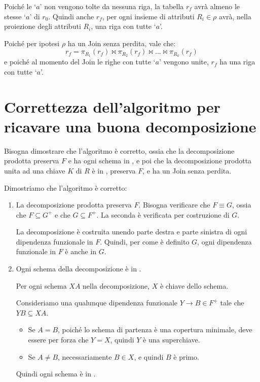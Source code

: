 Poich\'e le `$a$' non vengono tolte da nessuna riga, la tabella $r_f$ avr\`a almeno le stesse `$a$' di $r_0$. Quindi anche $r_f$, per ogni insieme di attributi $R_i \in \rho$ avr\`a, nella proiezione degli attributi $R_i$, una riga con tutte `$a$'.

Poich\'e per ipotesi $\rho$ ha un Join senza perdita, vale che:
\[
r_f = \pi_{R_1} (r_f) \Join \pi_{R_2} (r_f) \Join \ldots \Join \pi_{R_k} (r_f)
\]
e poich\'e al momento del Join le righe con tutte `$a$' vengono unite, $r_f$ ha una riga con tutte `$a$'.

\section{Correttezza dell'algoritmo per ricavare una buona decomposizione}

Bisogna dimostrare che l'algoritmo \`e corretto, ossia che la decomposizione prodotta preserva $F$ e ha ogni schema in , e poi che la decomposizione prodotta unita ad una chiave $K$ di $R$ \`e in , preserva $F$, e ha un Join senza perdita.

Dimostriamo che l'algoritmo \`e corretto:
\begin{enumerate}
    \item La decomposizione prodotta preserva $F$. Bisogna verificare che $F \equiv G$, ossia che $F \subseteq G^+$ e che $G \subseteq F^+$. La seconda \`e verificata per costruzione di $G$.

    La decomposizione \`e costruita unendo parte destra e parte sinistra di ogni dipendenza funzionale in $F$. Quindi, per come \`e definito $G$, ogni dipendenza funzionale in $F$ \`e anche in $G$.
    \item Ogni schema della decomposizione \`e in . 

    Per ogni schema $XA$ nella decomposizione, $X$ \`e chiave dello schema.

    Consideriamo una qualunque dipendenza funzionale $Y \to B \in F^+$ tale che $YB \subseteq XA$.
    \begin{itemize}
        \item Se $A = B$, poich\'e lo schema di partenza \`e una copertura minimale, deve essere per forza che $Y = X$, quindi $Y$ \`e una superchiave.
        \item Se $A \neq B$, necessariamente $B \in X$, e quindi $B$ \`e primo.
    \end{itemize}
    Quindi ogni schema \`e in .
\end{enumerate}

